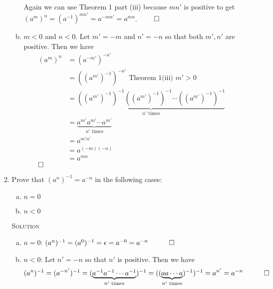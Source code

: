 \documentclass[twoside]{amsart}
\newcommand{\solution}{\textsc{Solution}\xspace}
\newcommand{\blank}{\vspace{5pt}}
\begin{document}
\begin{enumerate}[A.]
\begin{enumerate}[1]
\begin{enumerate}[(a)]
         Again we can use Theorem 1 part (iii) because $mn'$ is positive to
         get $(a^m)^n = (a^{-1})^{mn'} = a^{-mn'} = a^{mn}$. $\qed$

         \item $m<0$ and $n<0$. Let $m' = -m$ and $n' = -n$ so that both
         $m', n'$ are positive. Then we have
         \begin{align*} 
            (a^m)^n &= (a^{-m'})^{-n'} \\
                    &= ((a^{m'})^{-1})^{-n'} \text{ Theorem 1(iii) $m'>0$} \\
                    &= \underbrace{((a^{m'})^{-1})^{-1} ((a^{m'})^{-1})^{-1}
                        \cdots ((a^{m'})^{-1})^{-1}}_{n'\text{ times}} \\
                    &= \underbrace{a^{m'} a^{m'} \cdots a^{m'}}_{n'\text{ 
                    times}} \\
                    &= a^{m'n'} \\
                    &= a^{(-m)(-n)} \\
                    &= a^{mn}
         \end{align*}
         $\qed$

      \end{enumerate}

      \blank
      \item Prove that $(a^n)^{-1} = a^{-n}$ in the following cases:
      \begin{enumerate}[(a)]
         \item $n=0$
         \item $n<0$
      \end{enumerate}
      
      \blank \noindent \solution 
      \begin{enumerate}[(a)]
         \item $n=0$: $(a^n)^{-1} = (a^0)^{-1} = \epsilon = a^{-0} = a^{-n}
         \quad \qed$ 

         \item $n<0$: Let $n' = -n$ so that $n'$ is positive. Then
         we have 
         \[
         (a^n)^{-1} = (a^{-n'})^{-1} = (\underbrace{a^{-1} a^{-1} \cdots
         a^{-1}}_{n' \text{ times}})^{-1} = ((\underbrace{a a \cdots
         a}_{n'\text{ times}})^{-1})^{-1} = a^{n'} = a^{-n} \quad \qed
         \]

      \end{enumerate}
   \end{enumerate}


\end{enumerate}
\end{document}

